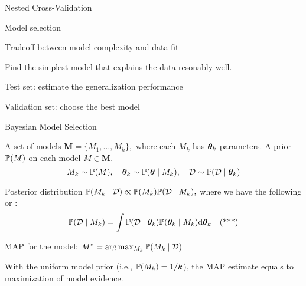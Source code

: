 \documentclass[handout,fleqn,aspectratio=169]{beamer}
\begin{document}
\begin{frame}{Nested Cross-Validation}



\plitemsep 0.1in

\bci 

\item Model selection
\bci
\item Tradeoff between model complexity and data fit

\item {} Find the simplest model that explains the data resonably well. 
\eci


\item Test set: estimate the generalization performance

\item Validation set: choose the best model
\eci
\end{frame}

\begin{frame}{Bayesian Model Selection}

\plitemsep 0.1in

\bci 

\item A set of models $\bm{M} = \{M_1, \ldots, M_k \},$ where each $M_k$ has $\bm{\theta}_k$ parameters. A prior $\mathbb{P}( M )$ on each model $M \in \bm{M}.$ 
$$
M_k \sim \mathbb{P}( M ), \quad \bm{\theta}_k \sim \mathbb{P}( \bm{\theta} \mid M_k ), \quad \mathcal D \sim \mathbb{P}( \mathcal D \mid \bm{\theta}_k )
$$
\item Posterior distribution $\mathbb{P}( M_k \mid \mathcal D ) \propto \mathbb{P}( M_k ) \mathbb{P}( \mathcal D \mid M_k ),$ where we have the following  or :
$$
\mathbb{P}( \mathcal D \mid M_k )  = \int \mathbb{P}( \mathcal D \mid \bm{\theta}_k ) \mathbb{P}( \bm{\theta}_k \mid M_k ) \text{d}\bm{\theta}_k \quad \text{(***)}
$$
\item MAP for the model: $M^* = \arg \max_{M_k} \mathbb{P}( M_k \mid \mathcal D )$
\item With the uniform model prior (i.e., $\mathbb{P}( M_k ) = 1/k$), the MAP estimate equals to maximization of model evidence. 
\eci
\end{frame}
\end{document}
